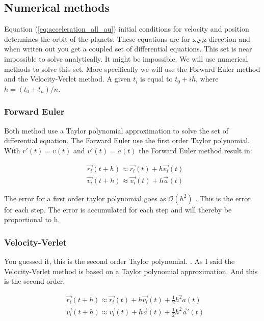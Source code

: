 \subsection{Numerical methods}

Equation (\ref{eq:acceleration_all_au}) initial conditions for velocity and position determines the orbit of the planets. 
These equations are for x,y,z direction and when writen out you get a coupled set of differential equations. This set is near impossible to solve analytically. It might be impossible. We will use numerical methods to solve this set. More specifically we will use the Forward Euler method and the Velocity-Verlet method. A given $t_i$ is equal to $t_0 + ih$, where $h = (t_{0} + t_{n})/n $.

\subsubsection{Forward Euler}

Both method use a Taylor polynomial approximation to solve the set of differential equation. The Forward Euler use the first order Taylor polynomial. With $r'(t) = v(t)$ and $v'(t) = a(t)$ the Forward Euler method result in: 
 
\begin{align}
	&\vec{r_i}(t+h) \approx \vec{r_i}(t) + h \vec{v_i}(t)
	\\
	&\vec{v_i}(t+h) \approx \vec{v_i}(t) + h \vec{a}(t)
	\label{eq:euler}
\end{align}

The error for a first order taylor polynomial goes as $\mathcal{O}(h^2)$ . This is the error for each step. The error is accumulated for each step and will thereby be proportional to h. 

\subsubsection{Velocity-Verlet}

You guessed it, this is the second order Taylor polynomial. . As I said the Velocity-Verlet method is based on a Taylor polynomial approximation. And this is the second order. 

\begin{align}
	&\vec{r_i}(t+h) \approx \vec{r_i}(t) + h \vec{v_i}(t) + \frac{1}{2} h^2 a(t)
	\\
	&\vec{v_i}(t+h) \approx \vec{v_i}(t) + h \vec{a}(t) + \frac{1}{2} h^2 \vec{a}'(t)
	\label{eq:verlet}
\end{align}

